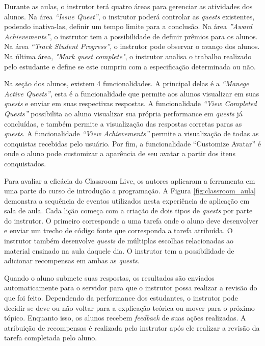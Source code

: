 \documentclass[
	12pt,				%
	oneside,			%
	a4paper,			%
	english,			%
	french,				%
	spanish,			%
	brazil,				%
	]{abntex2}
\begin{document}
Durante as aulas, o instrutor terá quatro áreas para gerenciar as atividades dos alunos. Na área \textit{“Issue Quest”}, o instrutor poderá controlar as \textit{quests} existentes, podendo inativa-las, definir um tempo limite para a conclusão. Na área \textit{”Award Achievements”}, o instrutor tem a possibilidade de definir prêmios para os alunos. Na área \textit{“Track Student Progress”}, o instrutor pode observar o avanço dos alunos. Na última área, \textit{"Mark quest complete"}, o instrutor analisa o trabalho realizado pelo estudante e define se este cumpriu com a especificação determinada ou não.

Na seção dos alunos, existem 4 funcionalidades. A principal delas é a \textit{“Manege Active Quests”}, esta é a funcionalidade que permite aos alunos visualizar em suas \textit{quests} e enviar em suas respectivas respostas. A funcionalidade \textit{“View Completed Quests”} possibilita ao aluno visualizar sua própria performance em \textit{quests} já concluídas, e também permite a visualização das respostas corretas paras as \textit{quests}. A funcionalidade \textit{“View Achievements”} permite a visualização de todas as conquistas recebidas pelo usuário. Por fim, a funcionalidade “Customize Avatar” é onde o aluno pode customizar a aparência de seu avatar a partir dos itens conquistados.

Para avaliar a eficácia do Classroom Live, os autores aplicaram a ferramenta em uma parte do curso de introdução a programação. A Figura \ref{fig:classroom_aula} demonstra a sequência de eventos utilizados nesta experiência de aplicação em sala de aula. Cada lição começa com a criação de dois tipos de \textit{quests} por parte do instrutor. O primeiro corresponde a uma tarefa onde o aluno deve desenvolver e enviar um trecho de código fonte que corresponda a tarefa atribuída. O instrutor também desenvolve \textit{quests} de múltiplas escolhas relacionadas ao material ensinado na aula daquele dia. O instrutor tem a possibilidade de adicionar recompensas em ambas as \textit{quests}.

Quando o aluno submete suas respostas, os resultados são enviados automaticamente para o servidor para que o instrutor possa realizar a revisão do que foi feito. Dependendo da performance dos estudantes, o instrutor pode decidir se deve ou não voltar para a explicação teórica ou mover para o próximo tópico. Enquanto isso, os alunos recebem \textit{feedback} de suas ações realizadas. A atribuição de recompensas é realizada pelo instrutor após ele realizar a revisão da tarefa completada pelo aluno.
\end{document}

